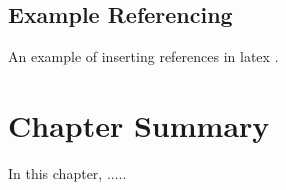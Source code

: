 \subsection{Example Referencing}
An example of inserting references in latex \cite{7890229} \cite{swapnil2016}. 

\section{Chapter Summary}
In this chapter, .....  
